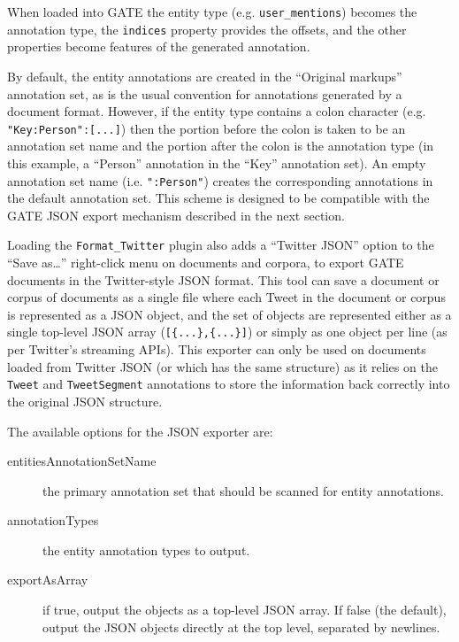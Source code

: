 When loaded into GATE the entity type (e.g.
\verb!user_mentions!) becomes the annotation type, the \verb!indices!  property
provides the offsets, and the other properties become features of the generated
annotation.

By default, the entity annotations are created in the ``Original markups''
annotation set, as is the usual convention for annotations generated by a
document format.  However, if the entity type contains a colon character (e.g.
\verb!"Key:Person":[...]!) then the portion before the colon is taken to be an
annotation set name and the portion after the colon is the annotation type (in
this example, a ``Person'' annotation in the ``Key'' annotation set).  An
empty annotation set name (i.e. \verb!":Person"!) creates the corresponding
annotations in the default annotation set.  This scheme is designed to be
compatible with the GATE JSON export mechanism described in the next section.


Loading the \verb!Format_Twitter! plugin also adds a ``Twitter JSON'' option to the
``Save as\ldots'' right-click menu on documents and corpora, to export GATE
documents in the Twitter-style JSON format.  This tool can save a document or
corpus of documents as a single file where each Tweet in the document or corpus
is represented as a JSON object, and the set of objects are represented either
as a single top-level JSON array (\verb![{...},{...}]!) or simply as one object
per line (as per Twitter's streaming APIs).  This exporter can only be used on
documents loaded from Twitter JSON (or which has the same structure) as it
relies on the \verb!Tweet! and \verb!TweetSegment! annotations to store the
information back correctly into the original JSON structure.

The available options for the JSON exporter are:
\begin{description}
\item[entitiesAnnotationSetName] the primary annotation set that should be
  scanned for entity annotations.
\item[annotationTypes] the entity annotation types to output.
\item[exportAsArray] if true, output the objects as a top-level JSON array.  If
  false (the default), output the JSON objects directly at the top level,
  separated by newlines.
\end{description}


